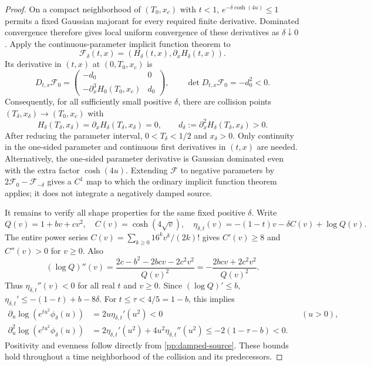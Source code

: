 \documentclass[11pt]{article}
\numberwithin{equation}{section}
\theoremstyle{definition}
\theoremstyle{remark}
\begin{document}
\begin{proof}
On a compact neighborhood of \((T_0,x_c)\) with \(t<1\),
\(e^{-\delta\cosh(4u)}\le1\) permits a fixed Gaussian majorant
for every required finite derivative. Dominated convergence therefore
gives local uniform convergence of these derivatives as
\(\delta\downarrow0\). Apply the continuous-parameter implicit
function theorem to
\[
 \mathscr F_\delta(t,x)
       =(H_\delta(t,x),\partial_xH_\delta(t,x)).
\]
Its derivative in \((t,x)\) at \((0,T_0,x_c)\) is
\[
 D_{t,x}\mathscr F_0=
 \begin{pmatrix}
 -d_0&0\\ -\partial_x^3H_0(T_0,x_c)&d_0
 \end{pmatrix},\qquad \det D_{t,x}\mathscr F_0=-d_0^2<0.
\]
Consequently, for all sufficiently small positive \(\delta\),
there are collision points \((T_\delta,x_\delta)\to(T_0,x_c)\)
with
\begin{equation}
 H_\delta(T_\delta,x_\delta)
  =\partial_xH_\delta(T_\delta,x_\delta)=0,\qquad
 d_\delta:=\partial_x^2H_\delta(T_\delta,x_\delta)>0.
 \label{pp:damped-collision}
\end{equation}
After reducing the parameter interval, \(0<T_\delta<1/2\) and
\(x_\delta>0\). Only continuity in the one-sided parameter and
continuous first derivatives in \((t,x)\) are needed. Alternatively,
the one-sided parameter derivative is Gaussian dominated even with
the extra factor \(\cosh(4u)\). Extending \(\mathscr F\) to
negative parameters by \(2\mathscr F_0-\mathscr F_{-\delta}\)
gives a \(C^1\) map to which the ordinary implicit function theorem
applies; it does not integrate a negatively damped source.

It remains to verify all shape properties for the same fixed positive
\(\delta\). Write
\[
 Q(v)=1+bv+cv^2,\quad C(v)=\cosh(4\sqrt v),\quad
 \eta_{\delta,t}(v)=-(1-t)v-\delta C(v)+\log Q(v).
\]
The entire power series
\(C(v)=\sum_{k\ge0}16^kv^k/(2k)!\) gives
\(C'(v)\ge8\) and \(C''(v)>0\) for \(v\ge0\).
Also
\begin{equation}
 (\log Q)''(v)
  =\frac{2c-b^2-2bcv-2c^2v^2}{Q(v)^2}
  =-\frac{2bcv+2c^2v^2}{Q(v)^2}.
 \label{pp:shape-log-polynomial}
\end{equation}
Thus \(\eta_{\delta,t}''(v)<0\) for all real \(t\) and
\(v\ge0\). Since \((\log Q)'\le b\),
\(\eta_{\delta,t}'\le-(1-t)+b-8\delta\). For
\(t\le\tau<4/5=1-b\), this implies
\begin{align*}
 \partial_u\log(e^{tu^2}\phi_\delta(u))
       &=2u\eta_{\delta,t}'(u^2)<0 &&(u>0),\\
 \partial_u^2\log(e^{tu^2}\phi_\delta(u))
       &=2\eta_{\delta,t}'(u^2)+4u^2\eta_{\delta,t}''(u^2)
         \le-2(1-\tau-b)<0.
\end{align*}
Positivity and evenness follow directly from
\eqref{pp:damped-source}. These bounds hold throughout a time
neighborhood of the collision and its predecessors.


\end{proof}
\end{document}

